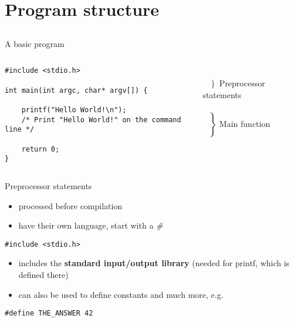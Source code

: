 \section{Program structure}
\subsection{}
\begin{frame}[fragile]{A basic program}
	\begin{columns}[T]
		\begin{lstlisting}
#include <stdio.h>

int main(int argc, char* argv[]) {

	printf("Hello World!\n");
	/* Print "Hello World!" on the command line */

	return 0;
}
\end{lstlisting}
		
		\ \\$\left. \begin{array}{c}\\\end{array}\right\rbrace $ Preprocessor statements
		\ \\\ \\$\left. \begin{array}{c}\\\\\\\\\\\end{array}\right\rbrace $ Main function
	\end{columns}
\end{frame}
\begin{frame}[fragile]{Preprocessor statements}	
	\begin{itemize}
		\item processed before compilation
		\item have their own language, start with a \textit{\#}
	\end{itemize}
	\begin{lstlisting}
#include <stdio.h>
\end{lstlisting}
	\begin{itemize}
		\item includes the \textbf{standard input/output library} (needed for printf, which is defined there)
		\item can also be used to define constants and much more, e.g.
	\end{itemize}
\begin{lstlisting}[numbers=none]
#define THE_ANSWER 42
\end{lstlisting}
\end{frame}
